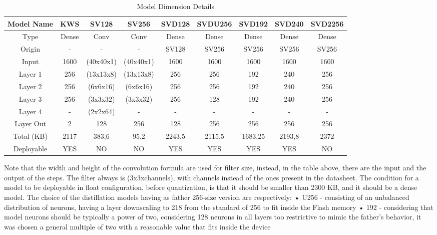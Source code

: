 \begin{table}[!h]
    \label{tabel:model sizes}
\centering
    \begin{tabular}{|c|c|c|c|c|c|c|c|c|}
        \hline
        Model Name & KWS & SV128 & SV256 & SVD128 & SVDU256 & SVD192 & SVD240 & SVD2256\\
        \hline
        Type & Dense & Conv & Conv & Dense & Dense & Dense & Dense & Dense\\
        Origin & - & - &  - & SV128 & SV256 & SV256 & SV256 & SV256\\
        Input & 1600 & (40x40x1) & (40x40x1) & 1600 & 1600 & 1600 & 1600 & 1600\\
        Layer 1 & 256 & (13x13x8) & (13x13x8) & 256 & 256 & 192 & 240 & 256\\
        Layer 2 & 256 & (6x6x16) & (6x6x16) & 256 & 256 & 192 & 240 & 256\\
        Layer 3 & 256 & (3x3x32) & (3x3x32) & 256 & 128 & 192 & 240 & 256\\
        Layer 4 & - & (2x2x64) & - & - & - & - & - & -\\
        Layer Out & 2 & 128 & 256 & 128 & 256 & 256 & 256 & 256\\
        Total (KB) & 2117 & 383,6 & 95,2 & 2243,5 & 2115,5 & 1683,25 & 2193,8 & 2372\\
        Deployable & YES & NO & NO & YES & YES & YES & YES & NO\\
        \hline
    \end{tabular}
    \caption{Model Dimension Details}
\end{table}
Note that the width and height of the convolution formula are used for filter size, instead, in the table above, there are the input and the output of the steps. The filter always is (3x3xchannels), with channels instead of the ones present in the datasheet. The condition for a model to be deployable in float configuration, before quantization, is that it should be smaller than 2300 KB, and it should be a dense model. The choice of the distillation models having as father 256-size version are respectively:\newline
• U256 - consisting of an unbalanced distribution of neurons, having a layer downscaling to 218 from the standard of 256 to fit inside the Flash memory\newline
• 192 - considering that model neurons should be typically a power of two, considering 128 neurons in all layers too restrictive to mimic the father's behavior, it was chosen a general multiple of two with a reasonable value that fits inside the device\newline
